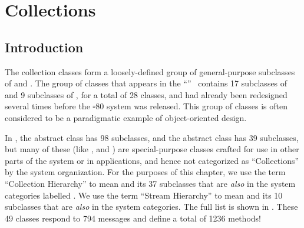 \documentclass[a4paper,10pt,twoside]{book}
\begin{document}
	\renewcommand{\nnbb}[2]{} %
	\sloppy
\fi
\chapter{Collections}
\label{cha:collections}

\section{Introduction}

The collection classes form a loosely-defined group of general-purpose subclasses of  and . The group of classes that appears in the ``''~\cite{Gold83a} contains 17 subclasses of  and 9 subclasses of , for a total of 28 classes, and had already been redesigned several times before the \st-80 system was released. This group of classes is often considered to be a paradigmatic example of object-oriented design.

In \squeak, the abstract class  has 98 subclasses, and the abstract class  has 39 subclasses, but many of these (like \mbox{,}  and ) are special-purpose classes crafted for use in other parts of the system or in applications, and hence not categorized as ``Collections'' by the system organization. For the purposes of this chapter, we use the term ``Collection Hierarchy'' to mean  and its 37 subclasses that are \emph{also} in the system categories labelled .
We use the term ``Stream Hierarchy'' to mean  and its 10 subclasses that are \emph{also} in the  system categories.
The full list is shown in .
These 49 classes respond to 794 messages and define a total of 1236 methods!
\end{document}
